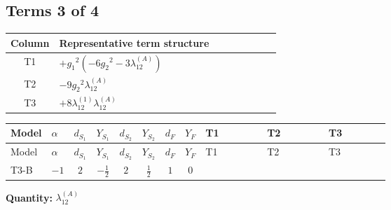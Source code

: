 \documentclass[8pt]{article}
\begin{document}
\begin{landscape}
\subsection*{Terms 3 of 4}
\begin{center}
\begin{tabular}{@{}c >{\raggedright\arraybackslash}p{0.82\linewidth}@{}}
\toprule
Column & Representative term structure \\
\midrule
T1 & \(\displaystyle +{g_1}^2 \left(-6 {g_2}^2-3 {\lambda_{12}^{(A)}}\right)\) \\
\midrule
T2 & \(\displaystyle -9 {g_2}^2 {\lambda_{12}^{(A)}}\) \\
\midrule
T3 & \(\displaystyle +8 {\lambda_{12}^{(1)}} {\lambda_{12}^{(A)}}\) \\
\midrule
\bottomrule
\end{tabular}
\end{center}
\smallskip
\tiny
\begin{longtable}{@{}llcccccc >{\raggedright\arraybackslash}p{0.21\linewidth} >{\raggedright\arraybackslash}p{0.21\linewidth} >{\raggedright\arraybackslash}p{0.21\linewidth}@{}}
\toprule
Model & $\alpha$ & $d_{S_1}$ & $Y_{S_1}$ & $d_{S_2}$ & $Y_{S_2}$ & $d_F$ & $Y_F$ & T1 & T2 & T3 \\
\midrule
\endfirsthead
\toprule
Model & $\alpha$ & $d_{S_1}$ & $Y_{S_1}$ & $d_{S_2}$ & $Y_{S_2}$ & $d_F$ & $Y_F$ & T1 & T2 & T3 \\
\midrule
\endhead
T3-B & $-1$ & $2$ & $-\frac{1}{2}$ & $2$ & $\frac{1}{2}$ & $1$ & $0$ & \scriptsize\adjustbox{max width=\linewidth}{$\begin{gathered} +{g_1}^2 \left(-6 {g_2}^2-3 {\lambda_{12}^{(A)}}\right)\end{gathered}$} & \scriptsize\adjustbox{max width=\linewidth}{$\begin{gathered} -9 {g_2}^2 {\lambda_{12}^{(A)}}\end{gathered}$} & \scriptsize\adjustbox{max width=\linewidth}{$\begin{gathered} +8 {\lambda_{12}^{(1)}} {\lambda_{12}^{(A)}}\end{gathered}$} \\
\midrule
\bottomrule
\end{longtable}
\clearpage
\noindent\textbf{Quantity: }$\lambda_{12}^{(A)}$\par\smallskip

\end{landscape}
\end{document}
